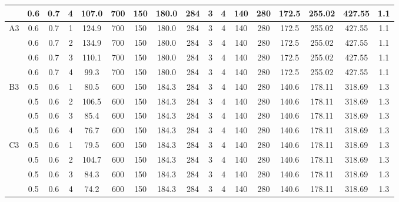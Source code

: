 \begin{table}[H]
{\begin{tabular}{|c|c|c|r|c|c|c|c|c|c|c|c|c|c|c|c|c|}
\cline{2-17}          & 0.6   & 0.7   & 4     & 107.0 & 700   & 150   & 180.0 & 284   & 3     & 4     & 140   & 280   & 172.5 & 255.02 & 427.55 & 1.1 \bigstrut\\
    \hline
    \multirow{4}[8]{*}{A3} & 0.6   & 0.7   & 1     & 124.9 & 700   & 150   & 180.0 & 284   & 3     & 4     & 140   & 280   & 172.5 & 255.02 & 427.55 & 1.1 \bigstrut\\
\cline{2-17}          & 0.6   & 0.7   & 2     & 134.9 & 700   & 150   & 180.0 & 284   & 3     & 4     & 140   & 280   & 172.5 & 255.02 & 427.55 & 1.1 \bigstrut\\
\cline{2-17}          & 0.6   & 0.7   & 3     & 110.1 & 700   & 150   & 180.0 & 284   & 3     & 4     & 140   & 280   & 172.5 & 255.02 & 427.55 & 1.1 \bigstrut\\
\cline{2-17}          & 0.6   & 0.7   & 4     & 99.3  & 700   & 150   & 180.0 & 284   & 3     & 4     & 140   & 280   & 172.5 & 255.02 & 427.55 & 1.1 \bigstrut\\
    \hline
    \multirow{4}[8]{*}{B3} & 0.5   & 0.6   & 1     & 80.5  & 600   & 150   & 184.3 & 284   & 3     & 4     & 140   & 280   & 140.6 & 178.11 & 318.69 & 1.3 \bigstrut\\
\cline{2-17}          & 0.5   & 0.6   & 2     & 106.5 & 600   & 150   & 184.3 & 284   & 3     & 4     & 140   & 280   & 140.6 & 178.11 & 318.69 & 1.3 \bigstrut\\
\cline{2-17}          & 0.5   & 0.6   & 3     & 85.4  & 600   & 150   & 184.3 & 284   & 3     & 4     & 140   & 280   & 140.6 & 178.11 & 318.69 & 1.3 \bigstrut\\
\cline{2-17}          & 0.5   & 0.6   & 4     & 76.7  & 600   & 150   & 184.3 & 284   & 3     & 4     & 140   & 280   & 140.6 & 178.11 & 318.69 & 1.3 \bigstrut\\
    \hline
    \multirow{4}[8]{*}{C3} & 0.5   & 0.6   & 1     & 79.5  & 600   & 150   & 184.3 & 284   & 3     & 4     & 140   & 280   & 140.6 & 178.11 & 318.69 & 1.3 \bigstrut\\
\cline{2-17}          & 0.5   & 0.6   & 2     & 104.7 & 600   & 150   & 184.3 & 284   & 3     & 4     & 140   & 280   & 140.6 & 178.11 & 318.69 & 1.3 \bigstrut\\
\cline{2-17}          & 0.5   & 0.6   & 3     & 84.3  & 600   & 150   & 184.3 & 284   & 3     & 4     & 140   & 280   & 140.6 & 178.11 & 318.69 & 1.3 \bigstrut\\
\cline{2-17}          & 0.5   & 0.6   & 4     & 74.2  & 600   & 150   & 184.3 & 284   & 3     & 4     & 140   & 280   & 140.6 & 178.11 & 318.69 & 1.3 \bigstrut\\

\end{tabular}}
\end{table}
